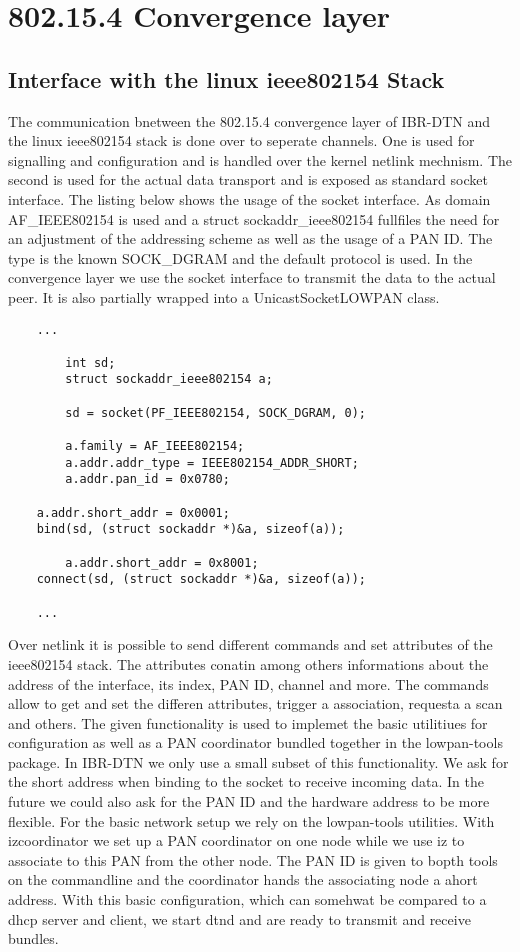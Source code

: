 \chapter{802.15.4 Convergence layer}
\label{802154layer}
\section{Interface with the linux ieee802154 Stack}

The communication bnetween the 802.15.4 convergence layer of IBR-DTN and the
linux ieee802154 stack is done over to seperate channels. One is used for
signalling and configuration and is handled over the kernel netlink mechnism.
The second is used for the actual data transport and is exposed as standard
socket interface. The listing below shows the usage of the socket interface. As
domain AF\_IEEE802154 is used and a struct sockaddr\_ieee802154 fullfiles the
need for an adjustment of the addressing scheme as well as the usage of a PAN
ID. The type is the known SOCK\_DGRAM and the default protocol is used. In the
convergence layer we use the socket interface to transmit the data to the actual
peer. It is also partially wrapped into a UnicastSocketLOWPAN class.

\begin{lstlisting}
	...

        int sd;
        struct sockaddr_ieee802154 a;

        sd = socket(PF_IEEE802154, SOCK_DGRAM, 0);

        a.family = AF_IEEE802154;
        a.addr.addr_type = IEEE802154_ADDR_SHORT;
        a.addr.pan_id = 0x0780;

	a.addr.short_addr = 0x0001;
	bind(sd, (struct sockaddr *)&a, sizeof(a));

        a.addr.short_addr = 0x8001;
	connect(sd, (struct sockaddr *)&a, sizeof(a));

	...
\end{lstlisting}

Over netlink it is possible to send different commands and set attributes of the
ieee802154 stack. The attributes conatin among others informations about the
address of the interface, its index, PAN ID, channel and more. The commands
allow to get and set the differen attributes, trigger a association, requesta a
scan and others. The given functionality is used to implemet the basic
utilitiues for configuration as well as a PAN coordinator bundled together in
the lowpan-tools package. In IBR-DTN we only use a small subset of this
functionality. We ask for the short address when binding to the socket to
receive incoming data. In the future we could also ask for the PAN ID and the
hardware address to be more flexible. For the basic network setup we rely on the
lowpan-tools utilities. With izcoordinator we set up a PAN coordinator on one
node while we use iz to associate to this PAN from the other node. The PAN ID is
given to bopth tools on the commandline and the coordinator hands the
associating node a ahort address. With this basic configuration, which can
somehwat be compared to a dhcp server and client, we start dtnd and are ready to
transmit and receive bundles.

